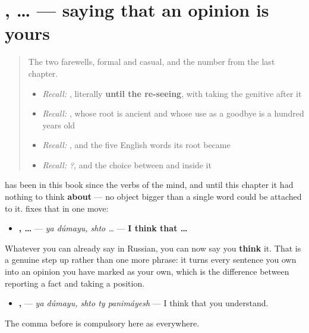 \section[\texorpdfstring{\ru{я} \ru{думаю}, \ru{что} … (ya dúmayu, shto …)}{я думаю, что … (ya dúmayu, shto …)}]{ ,  … — saying that an opinion is yours}

\label{lesson:RU-C18-dumayu-chto}



\begin{quote}
The two farewells, formal and casual, and the number from the last chapter.

\begin{itemize}
\raggedright
  \item \emph{Recall:} \emph{ }, literally \textbf{until the re-seeing}, with \emph{} taking the genitive after it
  \item \emph{Recall:} \emph{}, whose root is ancient and whose use as a goodbye is a hundred years old
  \item \emph{Recall:} \emph{}, and the five English words its root became
  \item \emph{Recall:} \emph{  ?}, and the choice between \emph{} and \emph{} inside it
\end{itemize}
\end{quote}

\begin{grammarlens}[title={Grammar lens — the opinion frame}]
\textbf{} has been in this book since the verbs of the mind, and until this chapter it had nothing to think \textbf{about} — no object bigger than a single word could be attached to it. \textbf{} fixes that in one move:

\begin{itemize}
\raggedright
  \item \textbf{ ,  …} — \emph{ya dúmayu, shto …} — \textbf{I think that …}
\end{itemize}

Whatever you can already say in Russian, you can now say you \textbf{think} it. That is a genuine step up rather than one more phrase: it turns every sentence you own into an opinion you have marked as your own, which is the difference between reporting a fact and taking a position.

\begin{itemize}
\raggedright
  \item \textbf{ ,   } — \emph{ya dúmayu, shto ty panimáyesh} — I think that you understand.
\end{itemize}

The comma before \textbf{} is compulsory here as everywhere.
\end{grammarlens}

